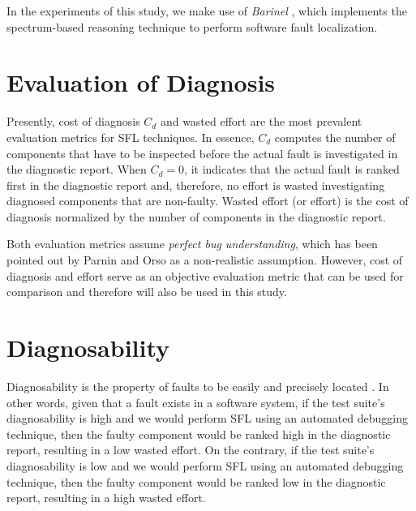\documentclass[twoside,a4paper,11pt]{memoir}
\begin{document}
In the experiments of this study, we make use of \emph{Barinel} \cite{Abreu:2009:SMF:1747491.1747511}, which implements the spectrum-based reasoning technique to perform software fault localization.

\section{Evaluation of Diagnosis}
Presently, cost of diagnosis $C_d$ and wasted effort \cite{Abreu:2009:SMF:1747491.1747511, 7390282, 6693085, Steimann:2013:TVV:2483760.2483767, DBLP:conf/icse/PerezAD17} are the most prevalent evaluation metrics for SFL techniques.
In essence, $C_d$ computes the number of components that have to be inspected before the actual fault is investigated in the diagnostic report.
When $C_d = 0$, it indicates that the actual fault is ranked first in the diagnostic report and, therefore, no effort is wasted investigating diagnosed components that are non-faulty.
Wasted effort (or effort) is the cost of diagnosis normalized by the number of components in the diagnostic report.

Both evaluation metrics assume \emph{perfect bug understanding}, which has been pointed out by Parnin and Orso \cite{Parnin:2011:ADT:2001420.2001445} as a non-realistic assumption.
However, cost of diagnosis and effort serve as an objective evaluation metric that can be used for comparison and therefore will also be used in this study.

\section{Diagnosability}
Diagnosability is the property of faults to be easily and precisely located \cite{730889}.
In other words, given that a fault exists in a software system, if the test suite's diagnosability is high and we would perform SFL using an automated debugging technique, then the faulty component would be ranked high in the diagnostic report, resulting in a low wasted effort.
On the contrary, if the test suite's diagnosability is low and we would perform SFL using an automated debugging technique, then the faulty component would be ranked low in the diagnostic report, resulting in a high wasted effort.
\end{document}
